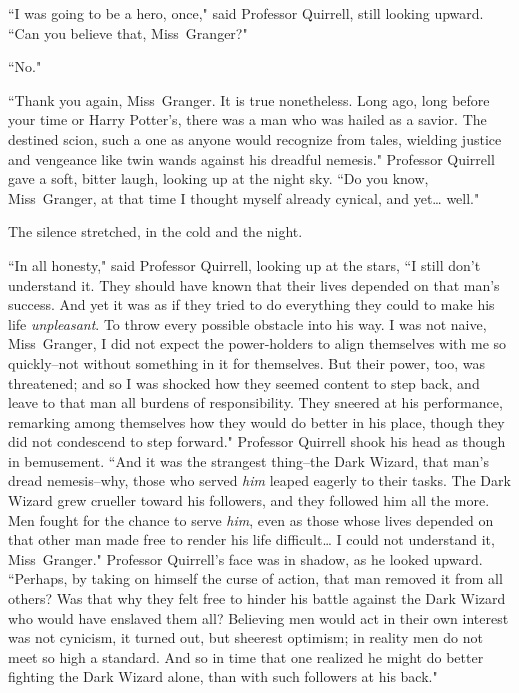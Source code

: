 ``I was going to be a hero, once," said Professor Quirrell, still looking upward. ``Can you believe that, Miss~Granger?"

``No."

``Thank you again, Miss~Granger. It is true nonetheless. Long ago, long before your time or Harry Potter's, there was a man who was hailed as a savior. The destined scion, such a one as anyone would recognize from tales, wielding justice and vengeance like twin wands against his dreadful nemesis." Professor Quirrell gave a soft, bitter laugh, looking up at the night sky. ``Do you know, Miss~Granger, at that time I thought myself already cynical, and yet{\ldots} well."

The silence stretched, in the cold and the night.

``In all honesty," said Professor Quirrell, looking up at the stars, ``I still don't understand it. They should have known that their lives depended on that man's success. And yet it was as if they tried to do everything they could to make his life \emph{unpleasant}. To throw every possible obstacle into his way. I was not naive, Miss~Granger, I did not expect the power-holders to align themselves with me so quickly\---not without something in it for themselves. But their power, too, was threatened; and so I was shocked how they seemed content to step back, and leave to that man all burdens of responsibility. They sneered at his performance, remarking among themselves how they would do better in his place, though they did not condescend to step forward." Professor Quirrell shook his head as though in bemusement. ``And it was the strangest thing\---the Dark Wizard, that man's dread nemesis\---why, those who served \emph{him} leaped eagerly to their tasks. The Dark Wizard grew crueller toward his followers, and they followed him all the more. Men fought for the chance to serve \emph{him}, even as those whose lives depended on that other man made free to render his life difficult{\ldots} I could not understand it, Miss~Granger." Professor Quirrell's face was in shadow, as he looked upward. ``Perhaps, by taking on himself the curse of action, that man removed it from all others? Was that why they felt free to hinder his battle against the Dark Wizard who would have enslaved them all? Believing men would act in their own interest was not cynicism, it turned out, but sheerest optimism; in reality men do not meet so high a standard. And so in time that one realized he might do better fighting the Dark Wizard alone, than with such followers at his back."

